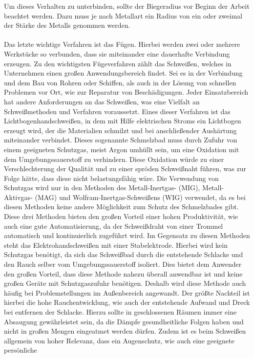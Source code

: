 Um dieses Verhalten zu unterbinden, sollte der Biegeradius vor Beginn der Arbeit beachtet werden. Dazu muss je nach Metallart ein Radius von ein oder zweimal 
der Stärke des Metalls genommen werden.\\\\
Das letzte wichtige Verfahren ist das Fügen. Hierbei werden zwei oder mehrere Werkstücke so verbunden, dass sie miteinander eine dauerhafte Verbindung 
erzeugen. Zu den wichtigsten Fügeverfahren zählt das Schweißen, welches in Unternehmen einen großen Anwendungsbereich findet. Sei es in der Verbindung 
und dem Bau von Rohren oder Schiffen, als auch in der Lösung von schnellen Problemen vor Ort, wie \zB zur Reparatur von Beschädigungen. Jeder Einsatzbereich 
hat andere Anforderungen an das Schweißen, was eine Vielfalt an Schweißmethoden und Verfahren voraussetzt. Eines dieser Verfahren ist das 
Lichtbogenhandschweißen, in dem mit Hilfe elektrischen Stroms ein Lichtbogen erzeugt wird, der die Materialien schmilzt und bei anschließender 
Aushärtung miteinander verbindet. Dieses sogenannte Schmelzbad muss durch Zufuhr von einem geeigneten Schutzgas, meist Argon umhüllt sein, um eine Oxidation 
mit dem Umgebungssauerstoff zu verhindern. Diese Oxidation würde zu einer Verschlechterung der Qualität und zu einer spröden Schweißnaht führen, was zur 
Folge hätte, dass diese nicht belastungsfähig wäre. Die Verwendung von Schutzgas wird nur in den Methoden des Metall-Inertgas- (MIG), Metall-Aktivgas- (MAG) 
und Wolfram-Inertgas-Schweißens (WIG) verwendet, da es bei diesen Methoden keine andere Möglichkeit zum Schutz des Schmelzbades gibt. Diese drei Methoden 
bieten den großen Vorteil einer hohen Produktivität, wie auch eine gute Automatisierung, da der Schweißdraht von einer Trommel automatisch und kontinuierlich 
zugeführt wird. Im Gegensatz zu diesen Methoden steht das Elektrohandschweißen mit einer Stabelektrode. Hierbei wird kein Schutzgas benötigt, da sich das 
Schweißbad durch die entstehende Schlacke und den Rauch selber vom Umgebungssauerstoff isoliert. Dies bietet dem Anwender den großen Vorteil, dass diese 
Methode nahezu überall anwendbar ist und keine großen Geräte mit Schutzgaszufuhr benötigen. Deshalb wird diese Methode auch häufig bei Problemstellungen 
im Außenbereich angewandt. Der größte Nachteil ist hierbei die hohe Rauchentwicklung, wie auch der entstehende Aufwand und Dreck bei entfernen der Schlacke. 
Hierzu sollte in geschlossenen Räumen immer eine Absaugung gewährleistet sein, da die Dämpfe gesundheitliche Folgen haben und nicht in großen Mengen 
eingeatmet werden dürfen. Zudem ist es beim Schweißen allgemein von hoher Relevanz, dass ein Augenschutz, wie auch eine geeignete persönliche 
